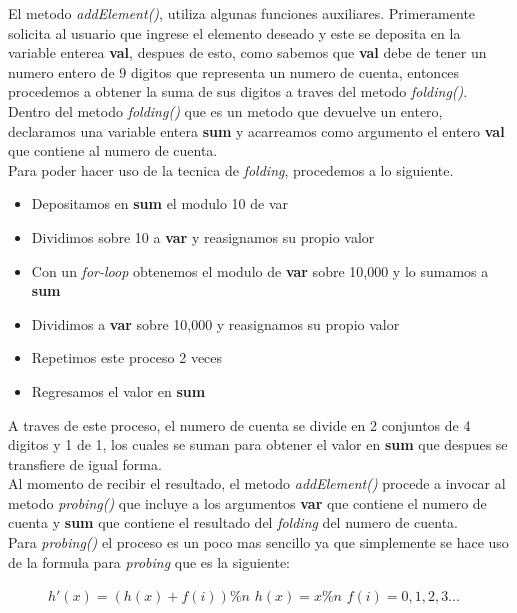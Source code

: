 \documentclass{article}
\begin{document}
			El metodo \emph{addElement()}, utiliza algunas funciones auxiliares. Primeramente solicita al usuario que ingrese el elemento deseado y este se deposita en la variable enterea \textbf{val}, despues de esto, como sabemos que \textbf{val} debe de tener un numero entero de 9 digitos que representa un numero de cuenta, entonces procedemos a obtener la suma de sus digitos a traves del metodo \emph{folding()}.\\
			
			Dentro del metodo \emph{folding()} que es un metodo que devuelve un entero, declaramos una variable entera \textbf{sum} y acarreamos como argumento el entero \textbf{val} que contiene al numero de cuenta.\\
			
			Para poder hacer uso de la tecnica de \textit{folding}, procedemos a lo siguiente. 
			
			\begin{itemize}
				\item Depositamos en \textbf{sum} el modulo 10 de var
				\item Dividimos sobre 10 a \textbf{var} y reasignamos su propio valor
				\item Con un \textit{for-loop} obtenemos el modulo de \textbf{var} sobre 10,000 y lo sumamos a \textbf{sum}
				\item Dividimos a \textbf{var} sobre 10,000 y reasignamos su propio valor
				\item Repetimos este proceso 2 veces
				\item Regresamos el valor en \textbf{sum}
			\end{itemize}
		
			A traves de este proceso, el numero de cuenta se divide en 2 conjuntos de 4 digitos y 1 de 1, los cuales se suman para obtener el valor en \textbf{sum} que despues se transfiere de igual forma.\\
			
			Al momento de recibir el resultado, el metodo \emph{addElement()} procede a invocar al metodo \emph{probing()} que incluye a los argumentos \textbf{var} que contiene el numero de cuenta y \textbf{sum} que contiene el resultado del \textit{folding} del numero de cuenta.\\
			
			Para \emph{probing()} el proceso es un poco mas sencillo ya que simplemente se hace uso de la formula para \textit{probing} que es la siguiente:
			
			
			\begin{figure}[H]
				\centering
				$h'(x)= (h(x) + f(i)) \% n$ 
				\newline
				\centering
				$h(x)= x \% n$
				\newline
				\centering
				$f(i)= 0,1,2,3...$ 
				\newline
			\end{figure}
		
\end{document}
